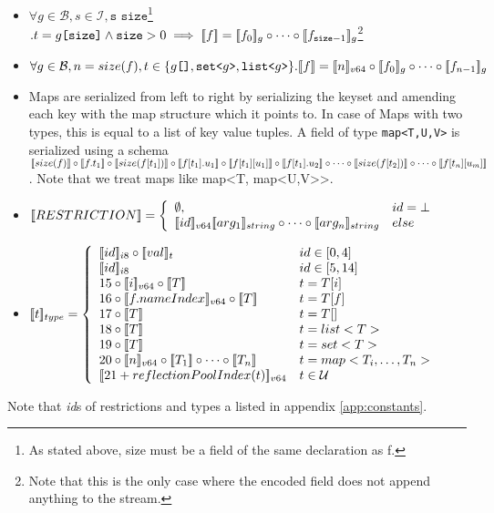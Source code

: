 \begin{itemize}
 \item $\forall g \in \mathcal{B}, s \in \mathcal{I}, \texttt{s size}$\footnote{As stated above, size must be a field of the same declaration as f.} $. t = g\texttt{[size]} \wedge \texttt{size} > 0 \implies [\![f]\!] = [\![f_0]\!]_g \circ \cdots \circ [\![f_{\texttt{size}-1}]\!]_g$\footnote{Note that this is the only case where the encoded field does not append anything to the stream.}
 
 \item $\forall g \in \mathcal{B}, n = size(f), t \in \{g\texttt{[]}, \texttt{set<}g\texttt{>}, \texttt{list<}g\texttt{>}\}. \den{f} = \den{n}_{v64} \circ \den{f_0}_g \circ \cdots \circ \den{f_{n-1}}_g$
 
 \item Maps are serialized from left to right by serializing the keyset and amending each key with the map structure which it points to. In case of Maps with two types, this is equal to a list of key value tuples.
 A field of type \verb/map<T,U,V>/ is serialized using a schema $ \den{size(f)} \circ \den{f.t_1} \circ \den{size(f[t_1])} \circ \den{f[t_1].u_1} \circ \den{f[t_1][u_1]} \circ \den{f[t_1].u_2} \circ \cdots \circ \den{size(f[t_2])} \circ \cdots \circ \den{f[t_n][u_m]}$. Note that we treat maps like map<T, map<U,V>>.
 
 \item $\den{RESTRICTION} = \left\{ 
   \begin{array}{l l}
     \emptyset, & id = \bot\\
     \den{id}_{v64}\den{arg_1}_{string}\circ \cdots \circ \den{arg_n}_{string} & else
   \end{array} \right.$
 
 \item $\den{t}_{type} = \left\{ 
   \begin{array}{l l}
   \den{id}_{i8} \circ \den{val}_{t} & id \in [0,4] \\
   \den{id}_{i8} & id \in [5,14] \\
   15 \circ \den{i}_{v64} \circ \den{T} & t = T[i]\\
   16 \circ \den{f.nameIndex}_{v64} \circ \den{T} & t = T[f]\\
   17 \circ \den{T} & t = T[]\\
   18 \circ \den{T} & t = list<T>\\
   19 \circ \den{T} & t = set<T>\\
   20\circ \den{n}_{v64} \circ \den{T_1} \circ \cdots \circ \den{T_n} & t = map<T_i,\ldots,T_n>\\
   \den{21+reflectionPoolIndex(t)}_{v64} & t \in \mathcal{U}\\
   \end{array} \right.$
\end{itemize}
Note that \textit{id}s of restrictions and types a listed in appendix \ref{app:constants}.


